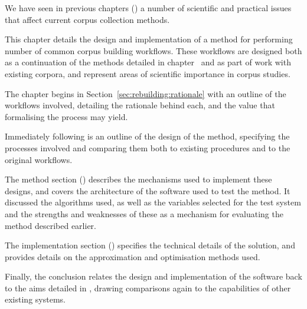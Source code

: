 

We have seen in previous chapters () a number of scientific and practical issues that affect current corpus collection methods.

This chapter details the design and implementation of a method for performing number of common corpus building workflows.  These workflows are designed both as a continuation of the methods detailed in chapter~ and as part of work with existing corpora, and represent areas of scientific importance in corpus studies.

The chapter begins in Section~\ref{sec:rebuilding:rationale} with an outline of the workflows involved, detailing the rationale behind each, and the value that formalising the process may yield.

Immediately following is an outline of the design of the method, specifying the processes involved and comparing them both to existing procedures and to the original workflows.

The method section () describes the mechanisms used to implement these designs, and covers the architecture of the software used to test the method.  It discussed the algorithms used, as well as the variables selected for the test system and the strengths and weaknesses of these as a mechanism for evaluating the method described earlier.

The implementation section () specifies the technical details of the solution, and provides details on the approximation and optimisation methods used.  

Finally, the conclusion relates the design and implementation of the software back to the aims detailed in , drawing comparisons again to the capabilities of other existing systems.
